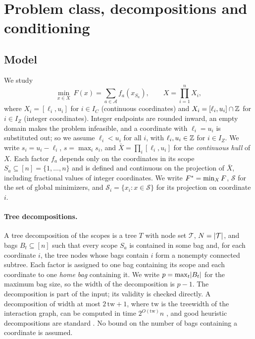 \section{Problem class, decompositions and conditioning}\label{sec:setting}

\subsection{Model}
We study
\begin{equation}\label{eq:model}
\min_{x\in X}\ F(x)=\sum_{a\in\mathcal A}f_a(x_{S_a}),\qquad
X=\prod_{i=1}^nX_i ,
\end{equation}
where $X_i=[\ell_i,u_i]$ for $i\in I_C$ (continuous coordinates) and
$X_i=[\ell_i,u_i]\cap\mathbb Z$ for $i\in I_Z$ (integer coordinates). Integer
endpoints are rounded inward, an empty domain makes the problem infeasible,
and a coordinate with $\ell_i=u_i$ is substituted out; so we assume
$\ell_i<u_i$ for all $i$, with $\ell_i,u_i\in\mathbb Z$ for $i\in I_Z$. We write
$s_i=u_i-\ell_i$, $s=\max_is_i$, and $\bar X=\prod_i[\ell_i,u_i]$ for the
\emph{continuous hull} of $X$. Each factor $f_a$ depends only on the
coordinates in its scope $S_a\subseteq[n]=\{1,\dots,n\}$ and is defined and
continuous on the projection of $\bar X$, including fractional values of
integer coordinates. We write $F^{*}=\min_XF$, $\mathcal S$ for the set of
global minimizers, and $\mathcal S_i=\{x_i:x\in\mathcal S\}$ for its
projection on coordinate $i$.

\paragraph{Tree decompositions.}
A tree decomposition of the scopes is a tree $T$ with node set $\mathcal T$,
$N=\lvert \mathcal T\rvert$, and bags $B_t\subseteq[n]$ such that every scope $S_a$
is contained in some bag and, for each coordinate $i$, the tree nodes whose
bags contain $i$ form a nonempty connected subtree. Each factor is assigned
to one bag containing its scope and each coordinate to one \emph{home bag}
containing it. We write $p=\max_t\lvert B_t\rvert$ for the maximum bag size, so the
width of the decomposition is $p-1$. The decomposition is part of the input;
its validity is checked directly. A decomposition of width at most
$2\,\mathrm{tw}+1$, where $\mathrm{tw}$ is the treewidth of the interaction
graph, can be computed in time $2^{O(\mathrm{tw})}n$ \cite{Korhonen2021}, and
good heuristic decompositions are standard \cite{BodlaenderKoster2010}. No bound
on the number of bags containing a coordinate is assumed.

